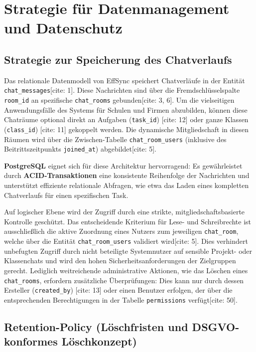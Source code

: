 \chapter{Strategie für Datenmanagement und Datenschutz}

\section{Strategie zur Speicherung des Chatverlaufs}

Das relationale Datenmodell von EffSync speichert Chatverläufe in der Entität \texttt{chat\_messages}[cite: 1]. Diese Nachrichten sind über die Fremdschlüsselspalte \texttt{room\_id} an spezifische \texttt{chat\_rooms} gebunden[cite: 3, 6]. Um die vielseitigen Anwendungsfälle des Systems für Schulen und Firmen abzubilden, können diese Chaträume optional direkt an Aufgaben (\texttt{task\_id}) [cite: 12] oder ganze Klassen (\texttt{class\_id}) [cite: 11] gekoppelt werden. Die dynamische Mitgliedschaft in diesen Räumen wird über die Zwischen-Tabelle \texttt{chat\_room\_users} (inklusive des Beitrittszeitpunkts \texttt{joined\_at}) abgebildet[cite: 5].

\textbf{PostgreSQL} eignet sich für diese Architektur hervorragend: Es gewährleistet durch \textbf{ACID-Transaktionen} eine konsistente Reihenfolge der Nachrichten und unterstützt effiziente relationale Abfragen, wie etwa das Laden eines kompletten Chatverlaufs für einen spezifischen Task.

Auf logischer Ebene wird der Zugriff durch eine strikte, mitgliedschaftsbasierte Kontrolle geschützt. Das entscheidende Kriterium für Lese- und Schreibrechte ist ausschließlich die aktive Zuordnung eines Nutzers zum jeweiligen \texttt{chat\_room}, welche über die Entität \texttt{chat\_room\_users} validiert wird[cite: 5]. Dies verhindert unbefugten Zugriff durch nicht beteiligte Systemnutzer auf sensible Projekt- oder Klassenchats und wird den hohen Sicherheitsanforderungen der Zielgruppen gerecht. Lediglich weitreichende administrative Aktionen, wie das Löschen eines \texttt{chat\_rooms}, erfordern zusätzliche Überprüfungen: Dies kann nur durch dessen Ersteller (\texttt{created\_by}) [cite: 13] oder einen Benutzer erfolgen, der über die entsprechenden Berechtigungen in der Tabelle \texttt{permissions} verfügt[cite: 50].

\section{Retention-Policy (Löschfristen und DSGVO-konformes Löschkonzept)}

